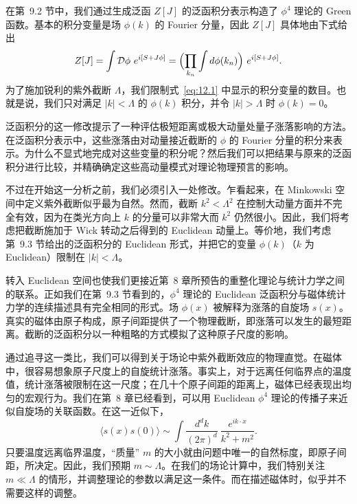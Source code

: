 在第~9.2 节中，我们通过生成泛函 $Z[J]$ 的泛函积分表示构造了 $\phi^4$ 理论的 Green 函数。基本的积分变量是场 $\phi(k)$ 的 Fourier 分量，因此 $Z[J]$ 具体地由下式给出
\begin{equation}
  Z[J] = \int \mathcal{D}\phi\ e^{i[S+J\phi]}
  = \Bigl( \prod_{k_n} \int d\phi(k_n) \Bigr)\ e^{i[S+J\phi]} .
  \label{eq:12.1}
\end{equation}
为了施加锐利的紫外截断 $\Lambda$，我们限制式~\eqref{eq:12.1} 中显示的积分变量的数目。也就是说，我们只对满足 $|k| < \Lambda$ 的 $\phi(k)$ 积分，并令 $|k| > \Lambda$ 时 $\phi(k) = 0$。

泛函积分的这一修改提示了一种评估极短距离或极大动量处量子涨落影响的方法。在泛函积分表示中，这些涨落由对动量接近截断的 $\phi$ 的 Fourier 分量的积分来表示。为什么不显式地完成对这些变量的积分呢？然后我们可以把结果与原来的泛函积分进行比较，并精确确定这些高动量模式对理论物理预言的影响。

不过在开始这一分析之前，我们必须引入一处修改。乍看起来，在 Minkowski 空间中定义紫外截断似乎最为自然。然而，截断 $k^2 < \Lambda^2$ 在控制大动量方面并不完全有效，因为在类光方向上 $k$ 的分量可以非常大而 $k^2$ 仍然很小。因此，我们将考虑把截断施加于 Wick 转动之后得到的 Euclidean 动量上。等价地，我们考虑第~9.3 节给出的泛函积分的 Euclidean 形式，并把它的变量 $\phi(k)$（$k$ 为 Euclidean）限制在 $|k| < \Lambda$。

转入 Euclidean 空间也使我们更接近第~8 章所预告的重整化理论与统计力学之间的联系。正如我们在第~9.3 节看到的，$\phi^4$ 理论的 Euclidean 泛函积分与磁体统计力学的连续描述具有完全相同的形式。场 $\phi(x)$ 被解释为涨落的自旋场 $s(x)$。真实的磁体由原子构成，原子间距提供了一个物理截断，即涨落可以发生的最短距离。截断的泛函积分以一种粗略的方式模拟了这种原子尺度的影响。

通过追寻这一类比，我们可以得到关于场论中紫外截断效应的物理直觉。在磁体中，很容易想象原子尺度上的自旋统计涨落。事实上，对于远离任何临界点的温度值，统计涨落被限制在这一尺度；在几十个原子间距的距离上，磁体已经表现出均匀的宏观行为。我们在第~8 章已经看到，可以用 Euclidean $\phi^4$ 理论的传播子来近似自旋场的关联函数。在这一近似下，
\begin{equation}
  \langle s(x)s(0)\rangle \sim \int \frac{d^dk}{(2\pi)^d}\
    \frac{e^{ik\cdot x}}{k^2+m^2} .
  \label{eq:12.2}
\end{equation}
只要温度远离临界温度，``质量'' $m$ 的大小就由问题中唯一的自然标度，即原子间距，所决定。因此，我们预期 $m \sim \Lambda$。在我们的场论计算中，我们特别关注 $m \ll \Lambda$ 的情形，并调整理论的参数以满足这一条件。而在描述磁体时，似乎并不需要这样的调整。

